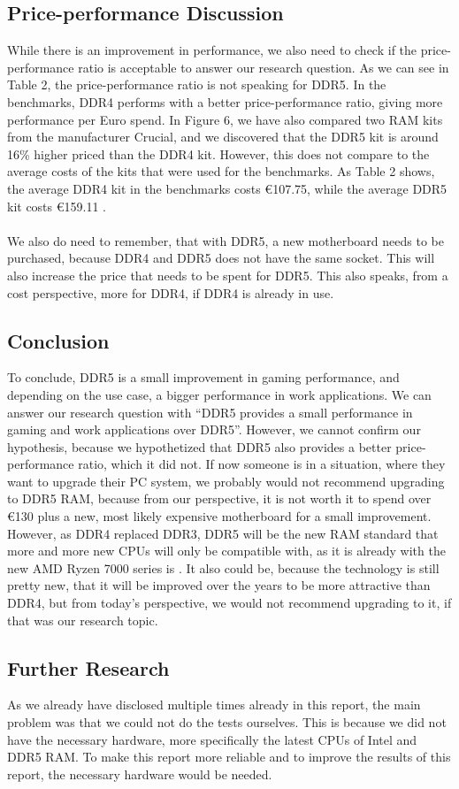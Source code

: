 \subsection{Price-performance Discussion}

While there is an improvement in performance, we also need to check if the price-performance ratio is acceptable to answer our research question. As we can see in Table 2, the price-performance ratio is not speaking for DDR5. In the benchmarks, DDR4 performs with a better price-performance ratio, giving more performance per Euro spend. In Figure 6, we have also compared two RAM kits from the manufacturer Crucial, and we discovered that the DDR5 kit is around 16\% higher priced than the DDR4 kit. However, this does not compare to the average costs of the kits that were used for the benchmarks. As Table 2 shows, the average DDR4 kit in the benchmarks costs €107.75, while the average DDR5 kit costs €159.11 \parencite{used_kits}. 
\\
\\
We also do need to remember, that with DDR5, a new motherboard needs to be purchased, because DDR4 and DDR5 does not have the same socket. This will also increase the price that needs to be spent for DDR5. This also speaks, from a cost perspective, more for DDR4, if DDR4 is already in use.

\subsection{Conclusion}

To conclude, DDR5 is a small improvement in gaming performance, and depending on the use case, a bigger performance in work applications. 
We can answer our research question with “DDR5 provides a small performance in gaming and work applications over DDR5”. However, we cannot confirm our hypothesis, because we hypothetized that DDR5 also provides a better price-performance ratio, which it did not. If now someone is in a situation, where they want to upgrade their PC system, we probably would not recommend upgrading to DDR5 RAM, because from our perspective, it is not worth it to spend over €130 plus a new, most likely expensive motherboard for a small improvement. However, as DDR4 replaced DDR3, DDR5 will be the new RAM standard that more and more new CPUs will only be compatible with, as it is already with the new AMD Ryzen 7000 series is \parencite{Ryzen_7000_RAM_specs}. It also could be, because the technology is still pretty new, that it will be improved over the years to be more attractive than DDR4, but from today's perspective, we would not recommend upgrading to it, if that was our research topic.

\subsection{Further Research}

As we already have disclosed multiple times already in this report, the main problem was that we could not do the tests ourselves. This is because we did not have the necessary hardware, more specifically the latest CPUs of Intel and DDR5 RAM. To make this report more reliable and to improve the results of this report, the necessary hardware would be needed. 